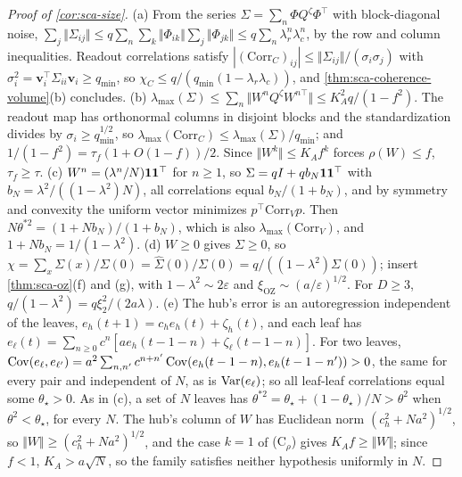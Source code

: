 \begin{proof}[Proof of \cref{cor:sca-size}]
(a) From the series $\Sigma=\sum_n\Phi Q^\zeta\Phi^\top$ with block-diagonal noise, $\sum_j\Vert\Sigma_{ij}\Vert\le q\sum_n\sum_k\Vert\Phi_{ik}\Vert\sum_j\Vert\Phi_{jk}\Vert\le q\sum_n\lambda_r^n\lambda_c^n$, by the row and column inequalities. Readout correlations satisfy $|(\mathrm{Corr}_C)_{ij}|\le\Vert\Sigma_{ij}\Vert/(\sigma_i\sigma_j)$ with $\sigma_i^2=\mathbf v_i^\top\Sigma_{ii}\mathbf v_i\ge q_{\min}$, so $\chi_C\le q/(q_{\min}(1-\lambda_r\lambda_c))$, and \cref{thm:sca-coherence-volume}(b) concludes. (b) $\lambda_{\max}(\Sigma)\le\sum_n\Vert W^nQ^\zeta W^{n\top}\Vert\le K_A^2q/(1-f^2)$. The readout map has orthonormal columns in disjoint blocks and the standardization divides by $\sigma_i\ge q_{\min}^{1/2}$, so $\lambda_{\max}(\mathrm{Corr}_C)\le\lambda_{\max}(\Sigma)/q_{\min}$; and $1/(1-f^2)=\tau_f(1+O(1-f))/2$. Since $\Vert W^k\Vert\le K_Af^k$ forces $\rho(W)\le f$, $\tau_f\ge\tau$. (c) $W^n=(\lambda^n/N)\mathbf{1}\mathbf{1}^\top$ for $n\ge1$, so $\Sigma=qI+qb_N\mathbf{1}\mathbf{1}^\top$ with $b_N=\lambda^2/((1-\lambda^2)N)$, all correlations equal $b_N/(1+b_N)$, and by symmetry and convexity the uniform vector minimizes $p^\top\mathrm{Corr}_Vp$. Then $N\theta^{\ast2}=(1+Nb_N)/(1+b_N)$, which is also $\lambda_{\max}(\mathrm{Corr}_V)$, and $1+Nb_N=1/(1-\lambda^2)$. (d) $W\ge0$ gives $\Sigma\ge0$, so $\chi=\sum_x\Sigma(x)/\Sigma(0)=\hat\Sigma(0)/\Sigma(0)=q/((1-\lambda^2)\Sigma(0))$; insert \cref{thm:sca-oz}(f) and (g), with $1-\lambda^2\sim2\varepsilon$ and $\xi_{\mathrm{OZ}}\sim(a/\varepsilon)^{1/2}$. For $D\ge3$, $q/(1-\lambda^2)=q\xi_2^2/(2a\lambda)$. (e) The hub's error is an autoregression independent of the leaves, $e_h(t+1)=c_he_h(t)+\zeta_h(t)$, and each leaf has $e_\ell(t)=\sum_{n\ge0}c^n[ae_h(t-1-n)+\zeta_\ell(t-1-n)]$. For two leaves, $\operatorname{Cov}(e_\ell,e_{\ell'})=a^2\sum_{n,n'}c^{n+n'}\operatorname{Cov}(e_h(t-1-n),e_h(t-1-n'))>0$, the same for every pair and independent of $N$, as is $\operatorname{Var}(e_\ell)$; so all leaf-leaf correlations equal some $\theta_\star>0$. As in (c), a set of $N$ leaves has $\theta^{\ast2}=\theta_\star+(1-\theta_\star)/N>\theta^2$ when $\theta^2<\theta_\star$, for every $N$. The hub's column of $W$ has Euclidean norm $(c_h^2+Na^2)^{1/2}$, so $\Vert W\Vert\ge(c_h^2+Na^2)^{1/2}$, and the case $k=1$ of \textup{(C$_\rho$)} gives $K_Af\ge\Vert W\Vert$; since $f<1$, $K_A>a\sqrt N$, so the family satisfies neither hypothesis uniformly in $N$.
\end{proof}


